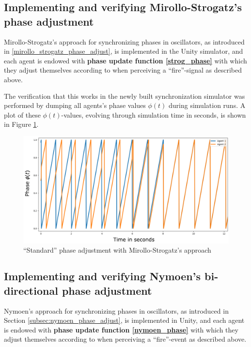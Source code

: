 		\subsection{Implementing and verifying Mirollo-Strogatz's phase adjustment} %
		
		Mirollo-Strogatz's approach for synchronizing phases in oscillators, as introduced in \ref{mirollo_strogatz_phase_adjust}, is implemented in the Unity simulator, and each agent is endowed with \textbf{phase update function \eqref{strog_phase}} with which they adjust themselves according to when perceiving a ``fire''-signal as described above.
		
		The verification that this works in the newly built synchronization simulator was performed by dumping all agents's phase values $\phi(t)$ during simulation runs. A plot of these $\phi(t)$-values, evolving through simulation time in seconds, is shown in Figure \ref{fig:strog_phase}.
		
		\begin{figure}[h]
			\centering
			\includegraphics[width=0.9\linewidth]{Assets/DocSegments/Chapters/ExperimentsAndResults/Figures/Validations/MirolloStrogatzPhaseAdjustmentSecondTry.pdf}
			\caption[Illustration of Mirollo \& Strogatz's ``standard'' phase adjustment ($Adj_{\phi}$) method.]{``Standard'' phase adjustment with Mirollo-Strogatz's approach}
			\label{fig:strog_phase}
		\end{figure}
		
		
		\subsection{Implementing and verifying Nymoen's bi-directional phase adjustment} %
		
		Nymoen's approach for synchronizing phases in oscillators, as introduced in Section \ref{subsec:nymoen_phase_adjust}, is implemented in Unity, and each agent is endowed with \textbf{phase update function \eqref{nymoen_phase}} with which they adjust themselves according to when perceiving a ``fire''-event as described above.
		
